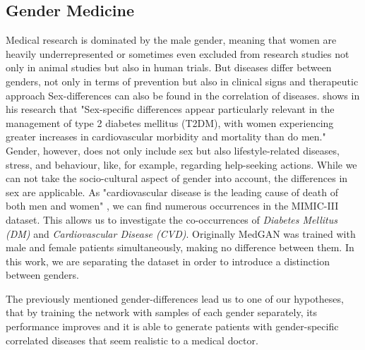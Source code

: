 \documentclass[11pt, a4paper, oneside]{book}
\begin{document}
\subsection{Gender Medicine}
Medical research is dominated by the male gender, meaning that women are heavily underrepresented or sometimes even excluded from research studies not only in animal studies but also in human trials. \citep{baggio2013gender} 
But diseases differ between genders, not only in terms of prevention but also in clinical signs and therapeutic approach  \citep{baggio2013gender}
Sex-differences can also be found in the correlation of diseases. \citep{kautzky2010sex} shows in his research that "Sex-specific differences appear particularly relevant in the management of type 2 diabetes mellitus (T2DM), with women experiencing greater increases in cardiovascular morbidity and mortality than do men." \citep{kautzky2010sex}
Gender, however, does not only include sex but also lifestyle-related diseases, stress, and behaviour, like, for example, regarding help-seeking actions.
While we can not take the socio-cultural aspect of gender into account, the differences in sex are applicable.
As "cardiovascular disease is the leading cause of death of both men and women" \citep{arain2009sex}, we can find numerous occurrences in the MIMIC-III dataset. This allows us to investigate the co-occurrences of \textit{Diabetes Mellitus (DM)} and \textit{Cardiovascular Disease (CVD)}.
Originally MedGAN was trained with male and female patients simultaneously, making no difference between them. In this work, we are separating the dataset in order to introduce a distinction between genders.

The previously mentioned gender-differences lead us to one of our hypotheses, that by training the network with samples of each gender separately, its performance improves and it is able to generate patients with gender-specific correlated diseases that seem realistic to a medical doctor.
\end{document}

